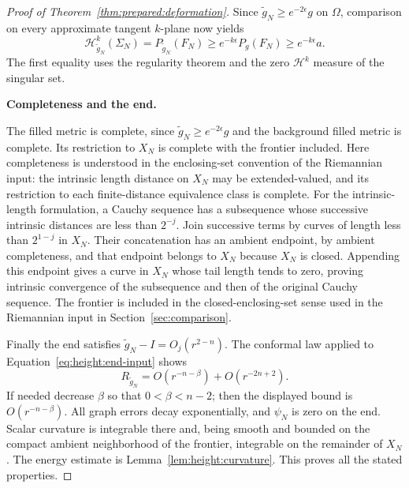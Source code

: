 \begin{proof}[Proof of Theorem~\ref{thm:prepared:deformation}]
Since $\widetilde g_N\ge e^{-2\epsilon}g$ on $\Omega$, comparison
on every approximate tangent $k$-plane now yields
\begin{equation}\label{eq:height:original-area}
 \mathcal H^k_{\widetilde g_N}(\Sigma_N)
 =P_{\widetilde g_N}(F_N)
 \ge e^{-k\epsilon}P_g(F_N)\ge e^{-k\epsilon}a.
\end{equation}
The first equality uses the regularity theorem and the zero
$\mathcal H^k$ measure of the singular set.

\smallskip\noindent\textbf{Completeness and the end.}

The filled metric is complete, since
$\widetilde g_N\ge e^{-2\epsilon}g$ and the background filled metric
is complete.  Its restriction to $X_N$ is complete with the frontier
included.  Here completeness is understood in the enclosing-set
convention of the Riemannian input: the intrinsic length distance on
$X_N$ may be extended-valued, and its restriction to each finite-distance
equivalence class is complete.  For the intrinsic-length formulation, a Cauchy sequence
has a subsequence whose successive intrinsic distances are less than
$2^{-j}$.  Join successive terms by curves of length less than
$2^{1-j}$ in $X_N$.  Their concatenation has an ambient endpoint,
by ambient completeness, and that endpoint belongs to $X_N$ because
$X_N$ is closed.  Appending this endpoint gives a curve in $X_N$
whose tail length tends to zero, proving intrinsic convergence of the
subsequence and then of the original Cauchy sequence.  The frontier
is included in the closed-enclosing-set sense used in
the Riemannian input in Section~\ref{sec:comparison}.

Finally the end satisfies $\widetilde g_N-I=O_j(r^{2-n})$.
The conformal law applied to Equation~\eqref{eq:height:end-input}
shows
\[
 R_{\widetilde g_N}=O(r^{-n-\beta})+O(r^{-2n+2}).
\]
If needed decrease $\beta$ so that $0<\beta<n-2$; then the displayed
bound is $O(r^{-n-\beta})$.  All graph errors decay exponentially,
and $\psi_N$ is zero on the end.  Scalar curvature is integrable there
and, being smooth and bounded on the compact ambient neighborhood of
the frontier, integrable on the remainder of $X_N$.
The energy estimate is Lemma~\ref{lem:height:curvature}.  This proves
all the stated properties.
\end{proof}

